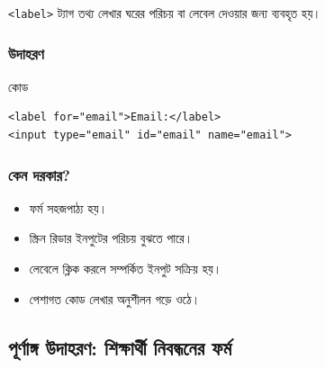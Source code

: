 \begin{definitionbox}{}
\texttt{<label>} ট্যাগ তথ্য লেখার ঘরের পরিচয় বা লেবেল দেওয়ার জন্য ব্যবহৃত হয়।
\end{definitionbox}

\subsubsection{উদাহরণ}

\begin{examplebox}{কোড}
\par\noindent\begin{minipage}{\linewidth}
\begin{verbatim}
<label for="email">Email:</label>
<input type="email" id="email" name="email">
\end{verbatim}
\end{minipage}\par
\end{examplebox}

\subsubsection{কেন দরকার?}

\begin{itemize}
\item ফর্ম সহজপাঠ্য হয়।
\item স্ক্রিন রিডার ইনপুটের পরিচয় বুঝতে পারে।
\item লেবেলে ক্লিক করলে সম্পর্কিত ইনপুট সক্রিয় হয়।
\item পেশাগত কোড লেখার অনুশীলন গড়ে ওঠে।
\end{itemize}

\subsection{পূর্ণাঙ্গ উদাহরণ: শিক্ষার্থী নিবন্ধনের ফর্ম}

